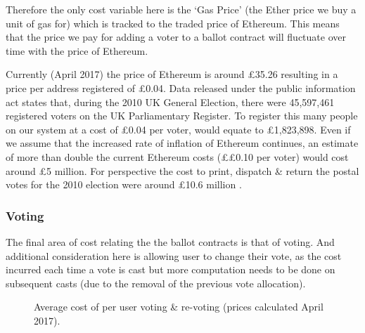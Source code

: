 \documentclass{article}
\begin{document}
	Therefore the only cost variable here is the `Gas Price' (the Ether price we buy a unit of gas for) which is tracked to the traded price of Ethereum. This means that the price we pay for adding a voter to a ballot contract will fluctuate over time with the price of Ethereum.

	Currently (April 2017) the price of Ethereum is around \pounds35.26 resulting in a price per address registered of \pounds0.04. Data released under the public information act \citep{69_statistics_from_2010_election} states that, during the 2010 UK General Election, there were 45,597,461 registered voters on the UK Parliamentary Register. To register this many people on our system at a cost of \pounds0.04 per voter, would equate to \pounds1,823,898. Even if we assume that the increased rate of inflation of Ethereum continues, an estimate of more than double the current Ethereum costs (\pounds £0.10 per voter) would cost around \pounds5 million. For perspective the cost to print, dispatch \& return the postal votes for the 2010 election were around \pounds10.6 million \citep{70_what_price_democracy_counting_the_cost_of_uk_elections}.
	
	\subsubsection{Voting}
	The final area of cost relating the the ballot contracts is that of voting. And additional consideration here is allowing user to change their vote, as the cost incurred each time a vote is cast but more computation needs to be done on subsequent casts (due to the removal of the previous vote allocation).
	
	
	\begin{figure}[h]
	\noindent  	
	\caption{Average cost of per user voting \& re-voting (prices calculated April 2017).}
	\end{figure}
\end{document}
